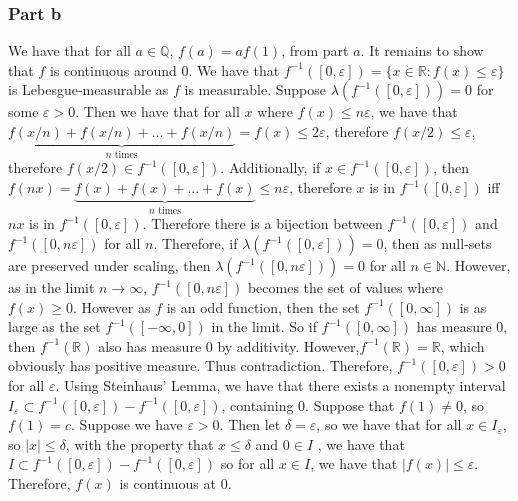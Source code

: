 \documentclass{article}
\theoremstyle{definition}
\numberwithin{theorem}{section}
\numberwithin{equation}{section}
\begin{document}
\subsubsection{Part b}
We have that for all $a \in \mathbb{Q}$, $f(a) = a f(1)$, from part $a$. It remains to show that $f$ is continuous around $0$. We have that $f^{-1}([0, \varepsilon]) = \lbrace x \in \mathbb{R}: f(x) \leq \varepsilon \rbrace$ is Lebesgue-measurable as $f$ is measurable. Suppose $\lambda(f^{-1}([0, \varepsilon])) = 0$ for some $\varepsilon > 0$. Then we have that for all $x$ where $f(x) \leq n\varepsilon$, we have that $\underbrace{f(x/n) + f(x/n) + ... + f(x/n)}_{n \text{ times}} = f(x) \leq 2 \varepsilon$, therefore $f(x/2) \leq \varepsilon$, therefore $f(x/2) \in f^{-1}([0, \varepsilon]) $. Additionally, if $x \in f^{-1}([0, \varepsilon])$, then $f(n x) = \underbrace{f(x) + f(x) + ... + f(x)}_{n \text{ times}}\leq n \varepsilon$, therefore $x$ is in $f^{-1}([0, \varepsilon])$ iff $nx$ is in $f^{-1}([0, \varepsilon])$. Therefore there is a bijection between $f^{-1}([0, \varepsilon])$ and $f^{-1}([0, n\varepsilon])$ for all $n$. Therefore, if $\lambda(f^{-1}([0, \varepsilon])) = 0$, then as null-sets are preserved under scaling, then $\lambda(f^{-1}([0, n\varepsilon])) = 0$ for all $n \in \mathbb{N}$. However, as in the limit $n \rightarrow \infty$, $f^{-1}([0, n\varepsilon])$ becomes the set of values where $f(x) \geq 0$. However as $f$ is an odd function, then the set $f^{-1}([0, \infty])$ is as large as the set $f^{-1}([-\infty, 0])$ in the limit. So if $f^{-1}([0, \infty])$ has measure 0, then $f^{-1}(\mathbb{R})$ also has measure 0 by additivity. However,$f^{-1}(\mathbb{R}) = \mathbb{R}$, which obviously has positive measure. Thus contradiction. Therefore, $f^{-1}([0, \varepsilon]) > 0$ for all $\varepsilon$. 
Using Steinhaus' Lemma, we have that there exists a nonempty interval $I_\varepsilon \subset f^{-1}([0, \varepsilon]) - f^{-1}([0, \varepsilon])$, containing $0$. Suppose that $f(1) \neq 0$, so $f(1) = c$.
Suppose we have $\varepsilon > 0$. Then let $\delta = \varepsilon$, so we have that for all $x \in I_{\varepsilon}$, so $|x| \leq \delta$, with the property that $x \leq \delta$ and $0 \in I$ , we have that $I \subset f^{-1}([0, \varepsilon]) - f^{-1}([0, \varepsilon])$ so for all $x \in I$, we have that $|f(x)| \leq \varepsilon$.  Therefore, $f(x)$ is continuous at $0$. 
\end{document}
